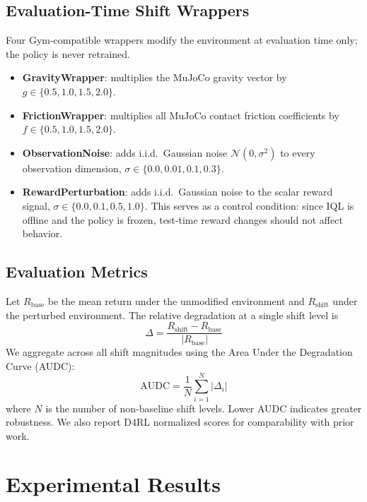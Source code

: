 \documentclass[conference]{IEEEtran}
\begin{document}
\subsection{Evaluation-Time Shift Wrappers}

Four Gym-compatible wrappers modify the environment at evaluation time only;
the policy is never retrained.

\begin{itemize}
  \item \textbf{GravityWrapper}: multiplies the MuJoCo gravity vector by
        $g \in \{0.5, 1.0, 1.5, 2.0\}$.
  \item \textbf{FrictionWrapper}: multiplies all MuJoCo contact friction
        coefficients by $f \in \{0.5, 1.0, 1.5, 2.0\}$.
  \item \textbf{ObservationNoise}: adds i.i.d.\ Gaussian noise
        $\mathcal{N}(0,\sigma^2)$ to every observation dimension,
        $\sigma \in \{0.0, 0.01, 0.1, 0.3\}$.
  \item \textbf{RewardPerturbation}: adds i.i.d.\ Gaussian noise to the
        scalar reward signal, $\sigma \in \{0.0, 0.1, 0.5, 1.0\}$.
        This serves as a control condition: since IQL is offline and the
        policy is frozen, test-time reward changes should not affect behavior.
\end{itemize}

\subsection{Evaluation Metrics}

Let $R_{\text{base}}$ be the mean return under the unmodified environment and
$R_{\text{shift}}$ under the perturbed environment. The relative degradation at
a single shift level is
\begin{equation}
  \Delta = \frac{R_{\text{shift}} - R_{\text{base}}}{|R_{\text{base}}|}
  \label{eq:delta}
\end{equation}
We aggregate across all shift magnitudes using the Area Under the
Degradation Curve (AUDC):
\begin{equation}
  \text{AUDC} = \frac{1}{N}\sum_{i=1}^{N}|\Delta_i|
  \label{eq:audc}
\end{equation}
where $N$ is the number of non-baseline shift levels. Lower AUDC indicates
greater robustness. We also report D4RL normalized scores for comparability
with prior work.

\section{Experimental Results}
\label{sec:eval}
\end{document}
